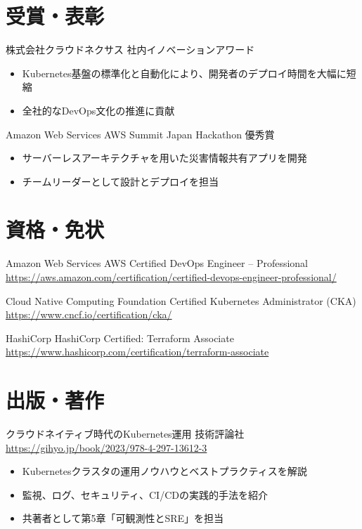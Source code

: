 \documentclass[a4paper, serif, 10pt]{moderncv}
\begin{document}
\section{受賞・表彰}

        {株式会社クラウドネクサス}
        {社内イノベーションアワード}
        {}
        {}
        {\begin{itemize}
\item Kubernetes基盤の標準化と自動化により、開発者のデプロイ時間を大幅に短縮
\item 全社的なDevOps文化の推進に貢献
\end{itemize}}

        {Amazon Web Services}
        {AWS Summit Japan Hackathon 優秀賞}
        {}
        {}
        {\begin{itemize}
\item サーバーレスアーキテクチャを用いた災害情報共有アプリを開発
\item チームリーダーとして設計とデプロイを担当
\end{itemize}}
\section{資格・免状}

        {Amazon Web Services}
        {AWS Certified DevOps Engineer – Professional}
        {\url{https://aws.amazon.com/certification/certified-devops-engineer-professional/}}
        {}
        {}

        {Cloud Native Computing Foundation}
        {Certified Kubernetes Administrator (CKA)}
        {\url{https://www.cncf.io/certification/cka/}}
        {}
        {}

        {HashiCorp}
        {HashiCorp Certified: Terraform Associate}
        {\url{https://www.hashicorp.com/certification/terraform-associate}}
        {}
        {}
\section{出版・著作}

        {クラウドネイティブ時代のKubernetes運用}
        {技術評論社}
        {\url{https://gihyo.jp/book/2023/978-4-297-13612-3}}
        {}
        {\begin{itemize}
\item Kubernetesクラスタの運用ノウハウとベストプラクティスを解説
\item 監視、ログ、セキュリティ、CI/CDの実践的手法を紹介
\item 共著者として第5章「可観測性とSRE」を担当
\end{itemize}}
\end{document}

